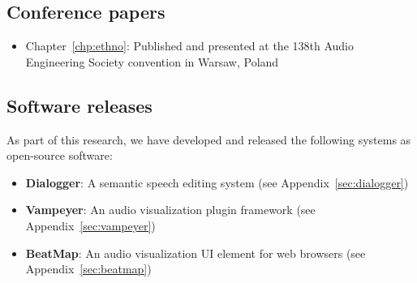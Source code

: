 \subsection*{Conference papers}

\begin{itemize}
  \item Chapter~\ref{chp:ethno}: Published and presented at the 138th Audio Engineering Society convention in Warsaw,
    Poland \citep{Baume2015}
\end{itemize}

\subsection*{Software releases}
As part of this research, we have developed and released the following systems as open-source software:

\begin{itemize}
  \item \textbf{Dialogger}: A semantic speech editing system (see Appendix~\ref{sec:dialogger})
  \item \textbf{Vampeyer}: An audio visualization plugin framework (see Appendix~\ref{sec:vampeyer})
  \item \textbf{BeatMap}: An audio visualization UI element for web browsers (see Appendix~\ref{sec:beatmap})
\end{itemize}

